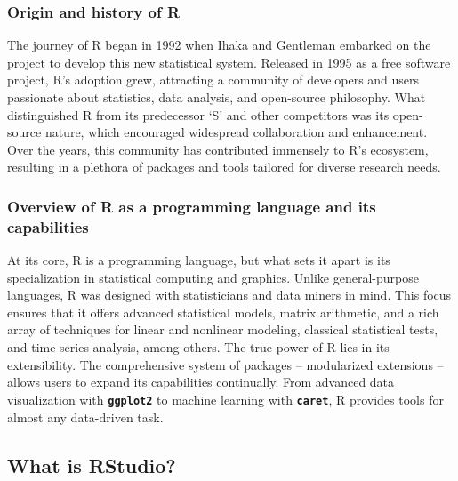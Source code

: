 \documentclass[
  b5paper]{book}
\begin{document}
\hypertarget{origin-and-history-of-r}{%
\subsubsection*{Origin and history of R}\label{origin-and-history-of-r}}

The journey of R began in 1992 when Ihaka and Gentleman embarked on the project to develop this new statistical system. Released in 1995 as a free software project, R's adoption grew, attracting a community of developers and users passionate about statistics, data analysis, and open-source philosophy. What distinguished R from its predecessor `S' and other competitors was its open-source nature, which encouraged widespread collaboration and enhancement. Over the years, this community has contributed immensely to R's ecosystem, resulting in a plethora of packages and tools tailored for diverse research needs.

\hypertarget{overview-of-r-as-a-programming-language-and-its-capabilities}{%
\subsubsection*{Overview of R as a programming language and its capabilities}\label{overview-of-r-as-a-programming-language-and-its-capabilities}}

At its core, R is a programming language, but what sets it apart is its specialization in statistical computing and graphics. Unlike general-purpose languages, R was designed with statisticians and data miners in mind. This focus ensures that it offers advanced statistical models, matrix arithmetic, and a rich array of techniques for linear and nonlinear modeling, classical statistical tests, and time-series analysis, among others. The true power of R lies in its extensibility. The comprehensive system of packages -- modularized extensions -- allows users to expand its capabilities continually. From advanced data visualization with \textbf{\texttt{ggplot2}} to machine learning with \textbf{\texttt{caret}}, R provides tools for almost any data-driven task.

\hypertarget{what-is-rstudio}{%
\subsection*{What is RStudio?}\label{what-is-rstudio}}
\end{document}
